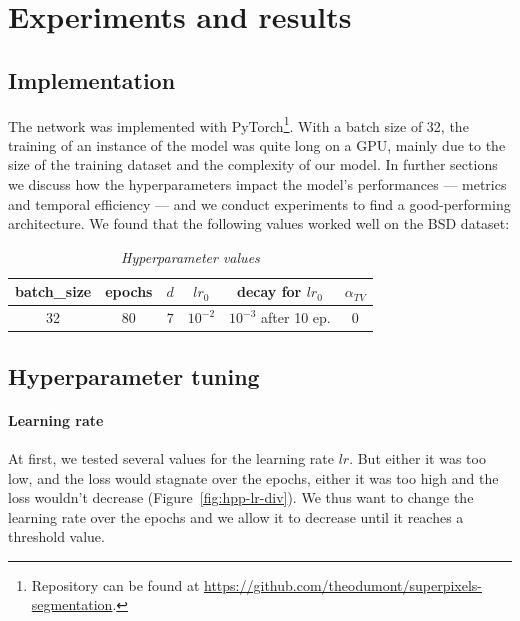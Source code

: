 \documentclass{article}
\begin{document}
\section{Experiments and results\label{s4}}

    \subsection{Implementation}
        The network was implemented with PyTorch\footnote{Repository can be found at \url{https://github.com/theodumont/superpixels-segmentation}.}. With a batch size of 32, the training of an instance of the model was quite long on a GPU, mainly due to the size of the training dataset and the complexity of our model. In further sections we discuss how the hyperparameters impact the model's performances --- metrics and temporal efficiency --- and we conduct experiments to find a good-performing architecture. We found that the following values worked well on the BSD dataset:
        \begin{table}[!ht]
            \centering
            \begin{tabular}{|c|c|c|c|c|c|}
                \hline
                batch\_size & epochs & $d$ & $lr_0$ & decay for $lr_0$ & $\alpha_{TV}$ \\
                \hline
                \hline
                32 & 80 & $7$ & $10^{-2}$ & $10^{-3}$ after 10 ep. & 0 \\
                \hline
            \end{tabular}
            \caption{\textit{Hyperparameter values}}
        \end{table}


    \subsection{Hyperparameter tuning}
        \paragraph{Learning rate}
        At first, we tested several values for the learning rate $lr$. But either it was too low, and the loss would stagnate over the epochs, either it was too high and the loss wouldn't decrease (Figure~\ref{fig:hpp-lr-div}). We thus want to change the learning rate over the epochs and we allow it to decrease until it reaches a threshold value.
\end{document}
